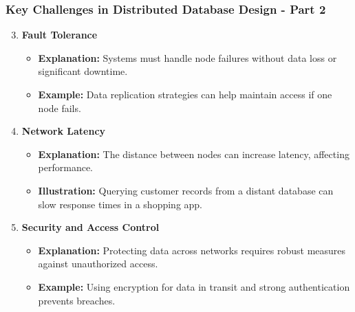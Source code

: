 \documentclass[aspectratio=169]{beamer}
\begin{document}
\begin{frame}[fragile]
    \frametitle{Key Challenges in Distributed Database Design - Part 2}
    \begin{enumerate}
        \setcounter{enumi}{2} %
        \item \textbf{Fault Tolerance}
            \begin{itemize}
                \item \textbf{Explanation:} Systems must handle node failures without data loss or significant downtime.
                \item \textbf{Example:} Data replication strategies can help maintain access if one node fails.
            \end{itemize}
        
        \item \textbf{Network Latency}
            \begin{itemize}
                \item \textbf{Explanation:} The distance between nodes can increase latency, affecting performance.
                \item \textbf{Illustration:} Querying customer records from a distant database can slow response times in a shopping app.
            \end{itemize}
        
        \item \textbf{Security and Access Control}
            \begin{itemize}
                \item \textbf{Explanation:} Protecting data across networks requires robust measures against unauthorized access.
                \item \textbf{Example:} Using encryption for data in transit and strong authentication prevents breaches.
            \end{itemize}
    \end{enumerate}
\end{frame}
\end{document}
